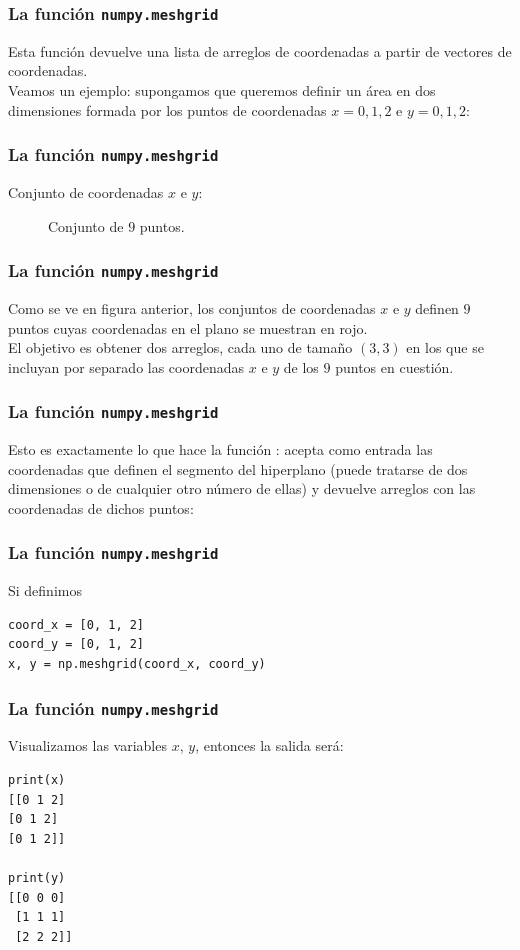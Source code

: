 \begin{frame}
\frametitle{La función \texttt{numpy.meshgrid}}
Esta función devuelve una lista de arreglos de coordenadas a partir de vectores de coordenadas.
\\
\bigskip
Veamos un ejemplo: supongamos que queremos definir un área en dos dimensiones formada por los puntos de coordenadas $x = 0, 1, 2$ e $y = 0, 1, 2$:
\end{frame}
\begin{frame}
\frametitle{La función \texttt{numpy.meshgrid}}
Conjunto de coordenadas $x$ e $y$:
\begin{figure}[h!]
    \centering
    
    \caption{Conjunto de $9$ puntos.}
\end{figure}
\end{frame}
\begin{frame}
\frametitle{La función \texttt{numpy.meshgrid}}
Como se ve en figura anterior, los conjuntos de coordenadas $x$ e $y$ definen $9$ puntos cuyas coordenadas en el plano se muestran en rojo.
\\
\bigskip
El objetivo es obtener dos arreglos, cada uno de tamaño $(3, 3)$ en los que se incluyan por separado las coordenadas $x$ e $y$ de los $9$ puntos en cuestión.
\end{frame}
\begin{frame}
\frametitle{La función \texttt{numpy.meshgrid}}
Esto es exactamente lo que hace la función : acepta como entrada las coordenadas que definen el segmento del hiperplano (puede tratarse de dos dimensiones o de cualquier otro número de ellas) y devuelve arreglos con las coordenadas de dichos puntos:
\end{frame}
\begin{frame}[fragile]
\frametitle{La función \texttt{numpy.meshgrid}}
Si definimos
\begin{verbatim}
coord_x = [0, 1, 2]
coord_y = [0, 1, 2]
x, y = np.meshgrid(coord_x, coord_y)
\end{verbatim}
\end{frame}
\begin{frame}[fragile]
\frametitle{La función \texttt{numpy.meshgrid}}
Visualizamos las variables $x$, $y$, entonces la salida será:
\fontsize{12}{12}\selectfont
\begin{verbatim}
print(x)
[[0 1 2]
[0 1 2]
[0 1 2]]

print(y)
[[0 0 0]
 [1 1 1]
 [2 2 2]]
\end{verbatim}
\end{frame}
